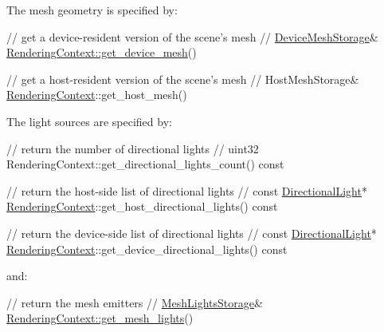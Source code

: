 \begin{DoxyParagraph}{}
The mesh geometry is specified by\+: ~\newline

\begin{DoxyCode}
\textcolor{comment}{// get a device-resident version of the scene's mesh}
\textcolor{comment}{//}
\hyperlink{class_device_mesh_storage}{DeviceMeshStorage}& \hyperlink{struct_rendering_context_a5be673e01646a32822c372ec32f701bd}{RenderingContext::get\_device\_mesh}()

\textcolor{comment}{// get a host-resident version of the scene's mesh}
\textcolor{comment}{//}
HostMeshStorage& \hyperlink{struct_rendering_context}{RenderingContext}::get\_host\_mesh()
\end{DoxyCode}

\end{DoxyParagraph}
\begin{DoxyParagraph}{}
The light sources are specified by\+: ~\newline

\begin{DoxyCode}
\textcolor{comment}{// return the number of directional lights}
\textcolor{comment}{//}
uint32 RenderingContext::get\_directional\_lights\_count() const

\textcolor{comment}{// return the host-side list of directional lights}
\textcolor{comment}{//}
const \hyperlink{struct_directional_light}{DirectionalLight}* \hyperlink{struct_rendering_context}{RenderingContext}::get\_host\_directional\_lights() 
      const

\textcolor{comment}{// return the device-side list of directional lights}
\textcolor{comment}{//}
const \hyperlink{struct_directional_light}{DirectionalLight}* \hyperlink{struct_rendering_context}{RenderingContext}::get\_device\_directional\_lights() 
      const
\end{DoxyCode}
 
\end{DoxyParagraph}
\begin{DoxyParagraph}{}
and\+: ~\newline

\begin{DoxyCode}
\textcolor{comment}{// return the mesh emitters}
\textcolor{comment}{//}
\hyperlink{struct_mesh_lights_storage}{MeshLightsStorage}& \hyperlink{struct_rendering_context_a076d2a2c86696da228fc6a49d55910ee}{RenderingContext::get\_mesh\_lights}()
\end{DoxyCode}
 
\end{DoxyParagraph}
